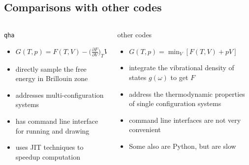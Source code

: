 \documentclass[13pt,aspectratio=169]{beamer}
\begin{document}
\subsection{Comparisons with other codes}
\begin{frame}{\subsecname}
	\begin{columns}
		\begin{column}{0.45\textwidth}
			\texttt{qha}\\
			\begin{itemize}
				\item $G(T,p) = F(T, V) - \Big( \frac{ \partial F }{ \partial V } \Big)_T V$
				\item directly sample the free energy in Brillouin zone
				\item addresses multi-configuration systems
				\item has command line interface for running and drawing
				\item uses JIT techniques to speedup computation
			\end{itemize}
		\end{column}

		\begin{column}{0.45\textwidth}
			other codes\\
			\begin{itemize}
				\item $G(T,p)= \min_{V}[F(T,V)+pV]$ \cite{phonopy}
				\item integrate the vibrational density of states $g(\omega)$ to get $F$ \cite{Petretto:2018gg}
				\item address the thermodynamic properties of single configuration systems
				\item command line interfaces are not very convenient
				\item Some also are Python, but are slow
			\end{itemize}
		\end{column}
	\end{columns}
\end{frame}
\end{document}
